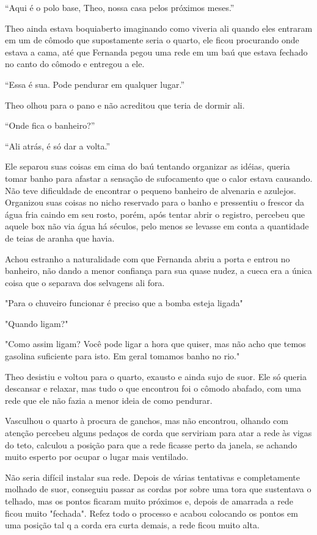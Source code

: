 ``Aqui é o polo base, Theo, nossa casa pelos próximos meses.''

Theo ainda estava boquiaberto imaginando como viveria ali quando eles
entraram em um de cômodo que supostamente seria o quarto, ele ficou
procurando onde estava a cama, até que Fernanda pegou uma rede em um baú
que estava fechado no canto do cômodo e entregou a ele.

``Essa é sua. Pode pendurar em qualquer lugar.''

Theo olhou para o pano e não acreditou que teria de dormir ali.

``Onde fica o banheiro?''

``Ali atrás, é só dar a volta.''

Ele separou suas coisas em cima do baú tentando organizar as idéias,
queria tomar banho para afastar a sensação de sufocamento que o calor
estava causando. Não teve dificuldade de encontrar o pequeno banheiro de
alvenaria e azulejos. Organizou suas coisas no nicho reservado para o
banho e pressentiu o frescor da água fria caindo em seu rosto, porém,
após tentar abrir o registro, percebeu que aquele box não via água há
séculos, pelo menos se levasse em conta a quantidade de teias de aranha
que havia.

Achou estranho a naturalidade com que Fernanda abriu a porta e entrou no
banheiro, não dando a menor confiança para sua quase nudez, a cueca era
a única coisa que o separava dos selvagens ali fora.

"Para o chuveiro funcionar é preciso que a bomba esteja ligada"

"Quando ligam?"

"Como assim ligam? Você pode ligar a hora que quiser, mas não acho que
temos gasolina suficiente para isto. Em geral tomamos banho no rio."

Theo desistiu e voltou para o quarto, exausto e ainda sujo de suor. Ele
só queria descansar e relaxar, mas tudo o que encontrou foi o cômodo
abafado, com uma rede que ele não fazia a menor ideia de como pendurar.

Vasculhou o quarto à procura de ganchos, mas não encontrou, olhando com
atenção percebeu alguns pedaços de corda que serviriam para atar a rede
às vigas do teto, calculou a posição para que a rede ficasse perto da
janela, se achando muito esperto por ocupar o lugar mais ventilado.

Não seria difícil instalar sua rede. Depois de várias tentativas e
completamente molhado de suor, conseguiu passar as cordas por sobre uma
tora que sustentava o telhado, mas os pontos ficaram muito próximos e,
depois de amarrada a rede ficou muito "fechada". Refez todo o processo e
acabou colocando os pontos em uma posição tal q a corda era curta
demais, a rede ficou muito alta.

